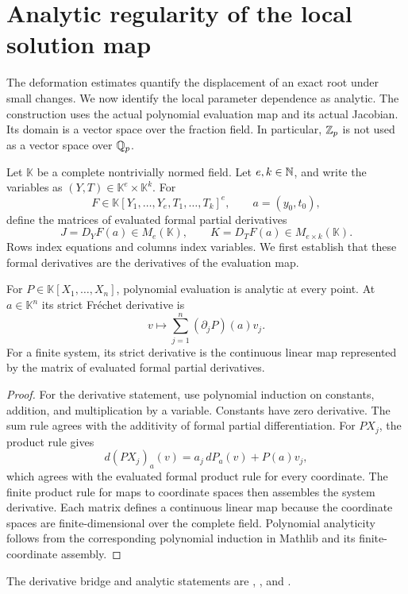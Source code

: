 \section{Analytic regularity of the local solution map}
\label{sec:regularity}
The deformation estimates quantify the displacement of an exact root under
small changes. We now identify the local parameter dependence as analytic.
The construction uses the actual polynomial evaluation map and its actual
Jacobian. Its domain is a vector space over the fraction field. In particular,
$\mathbb Z_p$ is not used as a vector space over $\mathbb Q_p$.

Let $\mathbb K$ be a complete nontrivially normed field. Let $e,k\in\mathbb N$, and
write the variables as $(Y,T)\in\mathbb K^e\times\mathbb K^k$. For
\[
 F\in\mathbb K[Y_1,\ldots,Y_e,T_1,\ldots,T_k]^e,
 \qquad a=(y_0,t_0),
\]
define the matrices of evaluated formal partial derivatives
\begin{equation}
 J=D_YF(a)\in M_e(\mathbb K),\qquad
 K=D_TF(a)\in M_{e\times k}(\mathbb K).
 \label{eq:regularity-blocks}
\end{equation}
Rows index equations and columns index variables. We first establish that
these formal derivatives are the derivatives of the evaluation map.

\begin{lemma}
\label{lem:actual-polynomial-derivative}
For $P\in\mathbb K[X_1,\ldots,X_n]$, polynomial evaluation is analytic at
every point. At $a\in\mathbb K^n$ its strict Fr\'echet derivative is
\[
 v\longmapsto\sum_{j=1}^n (\partial_jP)(a)v_j.
\]
For a finite system, its strict derivative is the continuous linear map
represented by the matrix of evaluated formal partial derivatives.
\end{lemma}
\begin{proof}
For the derivative statement, use polynomial induction on constants,
addition, and multiplication by a variable. Constants have zero derivative.
The sum rule agrees with the additivity of formal partial differentiation.
For $PX_j$, the product rule gives
\[
 d(PX_j)_a(v)=a_j\,dP_a(v)+P(a)v_j,
\]
which agrees with the evaluated formal product rule for every coordinate.
The finite product rule for maps to coordinate spaces then assembles the
system derivative. Each matrix defines a continuous linear map because the
coordinate spaces are finite-dimensional over the complete field.
Polynomial analyticity follows from the corresponding polynomial induction
in Mathlib and its finite-coordinate assembly.
\end{proof}
The derivative bridge and analytic statements are
,
, and
.

